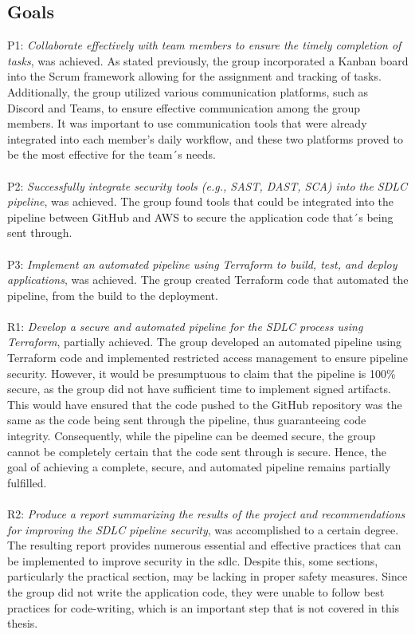 \subsection{Goals}
P1: \textit{Collaborate effectively with team members to ensure the timely completion of tasks}, was achieved. As stated previously, the group incorporated a Kanban board into the Scrum framework allowing for the assignment and tracking of tasks. Additionally, the group utilized various communication platforms, such as Discord and Teams, to ensure effective communication among the group members. It was important to use communication tools that were already integrated into each member's daily workflow, and these two platforms proved to be the most effective for the team´s needs. 
\\~\\
P2: \textit{Successfully integrate security tools (e.g., SAST, DAST, SCA) into the SDLC pipeline}, was achieved. The group found tools that could be integrated into the pipeline between GitHub and AWS to secure the application code that´s being sent through.
\\~\\
P3: \textit{Implement an automated pipeline using Terraform to build, test, and deploy applications}, was achieved. The group created Terraform code that automated the pipeline, from the build to the deployment. 
\\~\\
R1: \textit{Develop a secure and automated pipeline for the SDLC process using Terraform}, partially achieved. The group developed an automated pipeline using Terraform code and implemented restricted access management to ensure pipeline security. However, it would be presumptuous to claim that the pipeline is 100\% secure, as the group did not have sufficient time to implement signed artifacts. This would have ensured that the code pushed to the GitHub repository was the same as the code being sent through the pipeline, thus guaranteeing code integrity. Consequently, while the pipeline can be deemed secure, the group cannot be completely certain that the code sent through is secure. Hence, the goal of achieving a complete, secure, and automated pipeline remains partially fulfilled. 
\\~\\
R2: \textit{Produce a report summarizing the results of the project and recommendations for improving the SDLC pipeline security}, was accomplished to a certain degree. The resulting report provides numerous essential and effective practices that can be implemented to improve security in the \acrshort{sdlc}. Despite this, some sections, particularly the practical section, may be lacking in proper safety measures. Since the group did not write the application code, they were unable to follow best practices for code-writing, which is an important step that is not covered in this thesis.   



